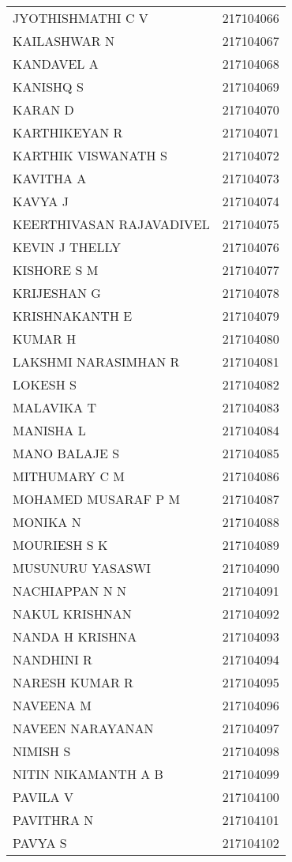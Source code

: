 \documentclass[11pt]{article}
\begin{document}
\begin{center}
\begin{tabular}{lr}
JYOTHISHMATHI C V & 217104066\\
KAILASHWAR N & 217104067\\
KANDAVEL A & 217104068\\
KANISHQ S & 217104069\\
KARAN D & 217104070\\
KARTHIKEYAN R & 217104071\\
KARTHIK VISWANATH S & 217104072\\
KAVITHA A & 217104073\\
KAVYA J & 217104074\\
KEERTHIVASAN RAJAVADIVEL & 217104075\\
KEVIN J THELLY & 217104076\\
KISHORE S M & 217104077\\
KRIJESHAN G & 217104078\\
KRISHNAKANTH E & 217104079\\
KUMAR H & 217104080\\
LAKSHMI NARASIMHAN R & 217104081\\
LOKESH S & 217104082\\
MALAVIKA T & 217104083\\
MANISHA L & 217104084\\
MANO BALAJE S & 217104085\\
MITHUMARY C M & 217104086\\
MOHAMED MUSARAF P M & 217104087\\
MONIKA N & 217104088\\
MOURIESH S K & 217104089\\
MUSUNURU YASASWI & 217104090\\
NACHIAPPAN N N & 217104091\\
NAKUL KRISHNAN & 217104092\\
NANDA H KRISHNA & 217104093\\
NANDHINI R & 217104094\\
NARESH KUMAR R & 217104095\\
NAVEENA M & 217104096\\
NAVEEN NARAYANAN & 217104097\\
NIMISH S & 217104098\\
NITIN NIKAMANTH A B & 217104099\\
PAVILA V & 217104100\\
PAVITHRA N & 217104101\\
PAVYA S & 217104102\\

\end{tabular}
\end{center}
\end{document}

